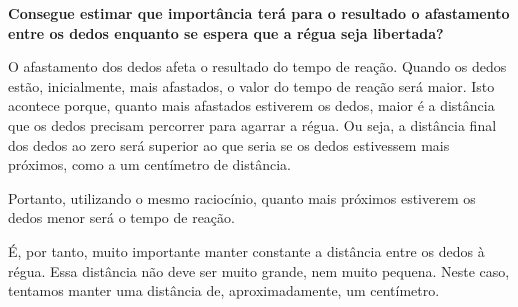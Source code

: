 \textbf{Consegue estimar que importância terá para o resultado o afastamento entre os dedos enquanto se espera que a régua seja libertada? }

O afastamento dos dedos afeta o resultado do tempo de reação. Quando os dedos estão, inicialmente, mais afastados, o valor do tempo de reação será maior. Isto acontece porque, quanto mais afastados estiverem os dedos, maior é a distância que os dedos precisam percorrer para agarrar a régua. Ou seja, a distância final dos dedos ao zero será superior ao que seria se os dedos estivessem mais próximos, como a um centímetro de distância.  

Portanto, utilizando o mesmo raciocínio, quanto mais próximos estiverem os dedos menor será o tempo de reação. 

É, por tanto, muito importante manter constante a distância entre os dedos à régua. Essa distância não deve ser muito grande, nem muito pequena. Neste caso, tentamos manter uma distância de, aproximadamente, um centímetro. 



